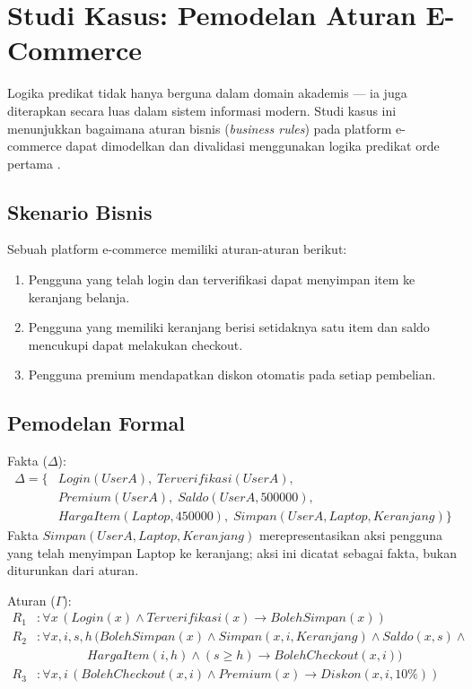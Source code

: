 \section{Studi Kasus: Pemodelan Aturan E-Commerce}

Logika predikat tidak hanya berguna dalam domain akademis --- ia juga diterapkan secara luas dalam sistem informasi modern. Studi kasus ini menunjukkan bagaimana aturan bisnis (\textit{business rules}) pada platform e-commerce dapat dimodelkan dan divalidasi menggunakan logika predikat orde pertama \cite{rosen2019}.

\subsection{Skenario Bisnis}

Sebuah platform e-commerce memiliki aturan-aturan berikut:
\begin{enumerate}
    \item Pengguna yang telah login dan terverifikasi dapat menyimpan item ke keranjang belanja.
    \item Pengguna yang memiliki keranjang berisi setidaknya satu item dan saldo mencukupi dapat melakukan checkout.
    \item Pengguna premium mendapatkan diskon otomatis pada setiap pembelian.
\end{enumerate}

\subsection{Pemodelan Formal}

Fakta ($\Delta$):
\begin{align*}
\Delta = \{ & Login(UserA), \; Terverifikasi(UserA), \\
            & Premium(UserA), \; Saldo(UserA, 500000), \\
            & HargaItem(Laptop, 450000), \; Simpan(UserA, Laptop, Keranjang) \}
\end{align*}
Fakta $Simpan(UserA, Laptop, Keranjang)$ merepresentasikan aksi pengguna yang telah menyimpan Laptop ke keranjang; aksi ini dicatat sebagai fakta, bukan diturunkan dari aturan.

Aturan ($\Gamma$):
\begin{align*}
R_1&: \forall x\, (Login(x) \wedge Terverifikasi(x) \rightarrow BolehSimpan(x)) \\
R_2&: \forall x, i, s, h\, (BolehSimpan(x) \wedge Simpan(x, i, Keranjang) \wedge Saldo(x, s) \wedge \\
    & \qquad\qquad HargaItem(i, h) \wedge (s \geq h) \rightarrow BolehCheckout(x, i)) \\
R_3&: \forall x, i\, (BolehCheckout(x, i) \wedge Premium(x) \rightarrow Diskon(x, i, 10\%))
\end{align*}

